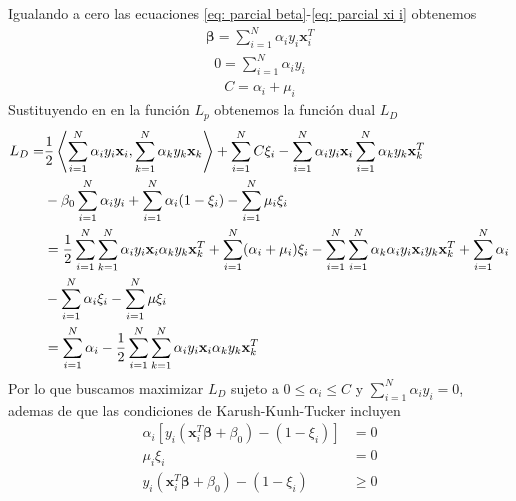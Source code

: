 \documentclass[letterpaper,12pt,oneside]{book}
\newcommand{\inprod}[2]{\left<#1, #2\right>} %
\begin{document}
{{{        Igualando a cero las ecuaciones \ref{eq: parcial beta}-\ref{eq: parcial xi i} obtenemos
        \begin{align}
            \boldsymbol{\beta}= \sum_{i=1}^{N} \alpha_i  y_i \mathbf{x}_i^T \label{eq:beta ns}
        \end{align} 
        \begin{align}
           0= \sum_{i=1}^{N} \alpha_i  y_i \label{eq:sum ns}
        \end{align}
         \begin{align}
            C= \alpha_i+\mu_i \label{eq:C ns}
        \end{align}
        Sustituyendo en en la función $L_p$ obtenemos la función dual $L_D$
        \begin{align}
            L_D = & \frac{1}{2} \inprod{\sum_{i=1}^{N} \alpha_i  y_i \mathbf{x}_i}{\sum_{k=1}^{N} \alpha_k  y_k \mathbf{x}_k} +  \sum_{i=1}^{N} C\xi_i - \sum_{i=1}^{N} \alpha_i  y_i \mathbf{x}_i \sum_{i=1}^{N} \alpha_k  y_k \mathbf{x}_k^T \notag\\
            &- \beta_0 \sum_{i=1}^{N} \alpha_i  y_i + \sum_{i=1}^{N}\alpha_i(1 - \xi_i)  - \sum_{i=1}^{N} \mu_i \xi_i \notag\\
            &= \frac{1}{2} \sum_{i=1}^{N}\sum_{k=1}^{N} \alpha_i  y_i \mathbf{x}_i  \alpha_k  y_k \mathbf{x}_k^T
            +\sum_{i=1}^{N} (\alpha_i+\mu_i)\xi_i-\sum_{i=1}^{N}\sum_{i=1}^{N} \alpha_k \alpha_i  y_i \mathbf{x}_i   y_k \mathbf{x}_k^T +  \sum_{i=1}^{N}\alpha_i \notag \\
            & - \sum_{i=1}^{N}\alpha_i \xi_i - \sum_{i=1}^{N}\mu\xi_i \notag\\
            &= \sum_{i=1}^{N}\alpha_i-\frac{1}{2} \sum_{i=1}^{N}\sum_{k=1}^{N} \alpha_i  y_i \mathbf{x}_i  \alpha_k  y_k \mathbf{x}_k^T \label{eq: 2.26}
        \end{align}
        Por lo que buscamos maximizar $L_D$ sujeto a $0 \leq \alpha_i \leq C$ y $\sum_{i=1}^{N} \alpha_i y_i = 0$, ademas de que las condiciones de Karush-Kunh-Tucker incluyen 
        \begin{align}
            \alpha_i \left[ y_i \left( \mathbf{x}_i^T \boldsymbol{\beta} + \beta_0 \right) - \left( 1 - \xi_i \right) \right] &= 0 \label{eq:kkt 1}\\
            \mu_i \xi_i &= 0 \label{eq:kkt 2}\\
            y_i \left( \mathbf{x}_i^T \boldsymbol{\beta} + \beta_0 \right) - \left( 1 - \xi_i \right) &\geq 0 \label{eq:kkt 3}
        \end{align}
        
}}}
\end{document}
